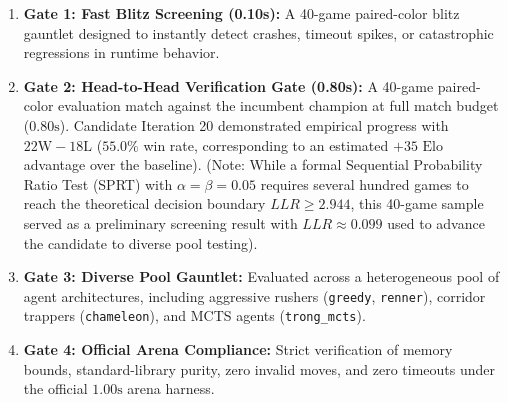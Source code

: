 \begin{enumerate}[leftmargin=1.5em]
    \item \textbf{Gate 1: Fast Blitz Screening (0.10s):} A 40-game paired-color blitz gauntlet designed to instantly detect crashes, timeout spikes, or catastrophic regressions in runtime behavior.
    \item \textbf{Gate 2: Head-to-Head Verification Gate (0.80s):} A 40-game paired-color evaluation match against the incumbent champion at full match budget ($0.80\text{s}$). Candidate Iteration 20 demonstrated empirical progress with $22\text{W} - 18\text{L}$ ($55.0\%$ win rate, corresponding to an estimated $+35\text{ Elo}$ advantage over the baseline). (Note: While a formal Sequential Probability Ratio Test (SPRT) with $\alpha=\beta=0.05$ requires several hundred games to reach the theoretical decision boundary $LLR \ge 2.944$, this 40-game sample served as a preliminary screening result with $LLR \approx 0.099$ used to advance the candidate to diverse pool testing).
    \item \textbf{Gate 3: Diverse Pool Gauntlet:} Evaluated across a heterogeneous pool of agent architectures, including aggressive rushers (\texttt{greedy}, \texttt{renner}), corridor trappers (\texttt{chameleon}), and MCTS agents (\texttt{trong\_mcts}).
    \item \textbf{Gate 4: Official Arena Compliance:} Strict verification of memory bounds, standard-library purity, zero invalid moves, and zero timeouts under the official $1.00\text{s}$ arena harness.
\end{enumerate}
